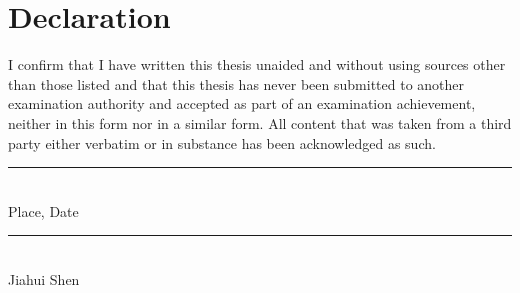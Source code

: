\chapter*{Declaration}
\thispagestyle{empty}

\noindent
I confirm that I have written this thesis unaided and without using sources other than those listed and that this thesis has never been submitted to another examination authority and accepted as part of an examination achievement, neither in this form nor in a similar form.
All content that was taken from a third party either verbatim or in substance has been acknowledged as such.

\vspace{3cm}

\begin{minipage}[t]{0.45\textwidth}
    \rule{\textwidth}{0.5pt}\\
	Place, Date
\end{minipage}
\hfill
\begin{minipage}[t]{0.45\textwidth}
	\rule{\textwidth}{0.5pt}\\
	Jiahui Shen
\end{minipage}

